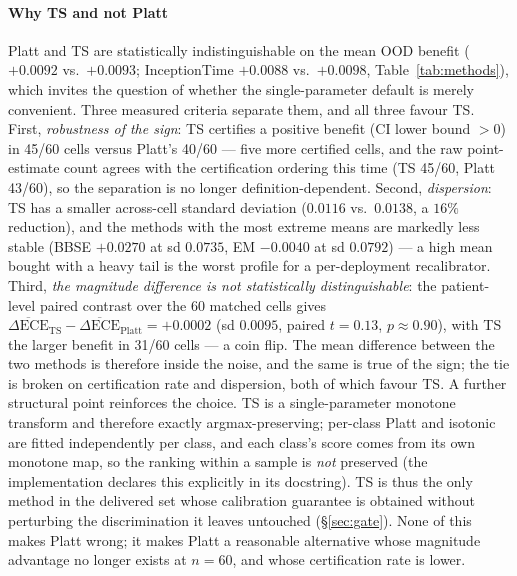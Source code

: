 \documentclass[review,12pt,nonatbib]{elsarticle}
\begin{document}
\paragraph{Why TS and not Platt} Platt and TS are statistically
indistinguishable on the mean OOD benefit ($+0.0092$ vs.\ $+0.0093$;
InceptionTime $+0.0088$ vs.\ $+0.0098$, Table~\ref{tab:methods}), which
invites the
question of whether the single-parameter default is merely convenient.
Three measured criteria separate them, and all three favour TS. First,
\emph{robustness of the sign}: TS certifies a positive benefit (CI
lower bound $>0$) in 45/60 cells versus Platt's 40/60 --- five more
certified cells, and the raw point-estimate count agrees with the
certification ordering this time (TS 45/60, Platt 43/60), so the
separation is no longer definition-dependent. Second, \emph{dispersion}:
TS has a smaller across-cell
standard deviation ($0.0116$ vs.\ $0.0138$, a $16\%$ reduction), and the
methods with the most extreme means are markedly less stable
(BBSE $+0.0270$ at sd $0.0735$, EM $-0.0040$ at sd $0.0792$) ---
a high mean bought with a heavy tail is the worst profile for a
per-deployment recalibrator. Third, \emph{the magnitude difference is not
statistically distinguishable}: the patient-level paired contrast over
the 60 matched cells gives
$\overline{\Delta\text{ECE}}_{\text{TS}}-\overline{\Delta\text{ECE}}_{\text{Platt}}
= +0.0002$ (sd $0.0095$, paired $t=0.13$, $p\approx0.90$), with TS the
larger benefit in 31/60 cells --- a coin flip. The mean
difference between the two methods is therefore inside the noise, and
the same is true of the sign; the tie is broken on
certification rate and dispersion, both of which favour TS. A further
structural point reinforces the choice. TS is a single-parameter
monotone transform and therefore exactly argmax-preserving; per-class
Platt and isotonic are fitted independently per class, and each class's
score comes from its own monotone map, so the ranking within a sample is
\emph{not} preserved (the implementation declares this explicitly in its
docstring). TS is thus the only method
in the delivered set whose calibration guarantee is obtained without
perturbing the discrimination it leaves untouched
(\S\ref{sec:gate}). None of this makes Platt wrong; it makes Platt a
reasonable alternative whose magnitude advantage no longer exists at
$n=60$, and whose certification rate is lower.

\end{document}

